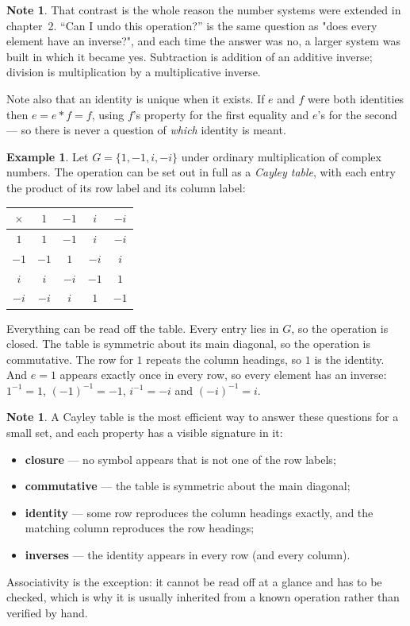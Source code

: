 \documentclass[11pt,a4paper]{article}
\theoremstyle{definition}
\newtheorem{example}[thm]{Example}
\newtheorem{note}[thm]{Note}
\begin{document}
\begin{note}
That contrast is the whole reason the number systems were extended in chapter~2.
``Can I undo this operation?'' is the same question as "does every element have an
inverse?", and each time the answer was no, a larger system was built in which it
became yes. Subtraction is addition of an additive inverse; division is
multiplication by a multiplicative inverse.

Note also that an identity is unique when it exists. If $e$ and $f$ were both
identities then $e=e*f=f$, using $f$'s property for the first equality and $e$'s
for the second --- so there is never a question of \emph{which} identity is meant.
\end{note}

\begin{example}
Let $G=\{1,-1,i,-i\}$ under ordinary multiplication of complex numbers. The
operation can be set out in full as a \emph{Cayley table}, with each entry the
product of its row label and its column label:

\begin{table}[H]
\centering
\begin{tabular}{c|cccc}
$\times$ & $1$ & $-1$ & $i$ & $-i$\\
\hline
$1$ & $1$ & $-1$ & $i$ & $-i$\\
$-1$ & $-1$ & $1$ & $-i$ & $i$\\
$i$ & $i$ & $-i$ & $-1$ & $1$\\
$-i$ & $-i$ & $i$ & $1$ & $-1$\\
\end{tabular}
\end{table}

Everything can be read off the table. Every entry lies in $G$, so the operation is
closed. The table is symmetric about its main diagonal, so the operation is
commutative. The row for $1$ repeats the column headings, so $1$ is the identity.
And $e=1$ appears exactly once in every row, so every element has an inverse:
$1^{-1}=1$, $(-1)^{-1}=-1$, $i^{-1}=-i$ and $(-i)^{-1}=i$.
\end{example}

\begin{note}
A Cayley table is the most efficient way to answer these questions for a small
set, and each property has a visible signature in it:
\begin{itemize}
\item \textbf{closure} --- no symbol appears that is not one of the row labels;
\item \textbf{commutative} --- the table is symmetric about the main diagonal;
\item \textbf{identity} --- some row reproduces the column headings exactly, and the
matching column reproduces the row headings;
\item \textbf{inverses} --- the identity appears in every row (and every column).
\end{itemize}
Associativity is the exception: it cannot be read off at a glance and has to be
checked, which is why it is usually inherited from a known operation rather than
verified by hand.
\end{note}
\pagebreak
\end{document}
